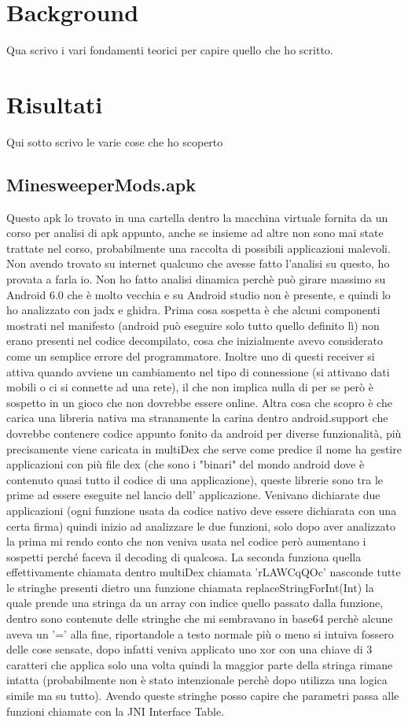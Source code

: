 \documentclass[a4paper,11pt]{article}
\theoremstyle{plain}
\theoremstyle{definition}
\theoremstyle{remark}
\begin{document}
\section{Background}
Qua scrivo i vari fondamenti teorici per capire quello che ho scritto.
\section{Risultati}
Qui sotto scrivo le varie cose che ho scoperto
\subsection{MinesweeperMods.apk}
Questo apk lo trovato in una cartella dentro la macchina virtuale fornita da un corso per analisi di apk appunto, anche se insieme ad altre non sono mai state trattate nel corso, probabilmente una raccolta di possibili applicazioni malevoli. Non avendo trovato su internet qualcuno che avesse fatto l'analisi su questo, ho provata a farla io. Non ho fatto analisi dinamica perchè può girare massimo su Android 6.0 che è molto vecchia e su Android studio non è presente, e quindi lo ho analizzato con jadx e ghidra. Prima cosa sospetta è che alcuni componenti mostrati nel manifesto (android può eseguire solo tutto quello definito lì) non erano presenti nel codice decompilato, cosa che inizialmente avevo considerato come un semplice errore del programmatore. Inoltre uno di questi receiver si attiva quando avviene un cambiamento nel tipo di connessione (si attivano dati mobili o ci si connette ad una rete), il che non implica nulla di per se però è sospetto in un gioco che non dovrebbe essere online. Altra cosa che scopro è che carica una libreria nativa ma stranamente la carina dentro android.support che dovrebbe contenere codice appunto fonito da android per diverse funzionalità, più precisamente viene caricata in multiDex che serve come predice il nome ha gestire applicazioni con più file dex (che sono i "binari" del mondo android dove è contenuto quasi tutto il codice di una applicazione), queste librerie sono tra le prime ad essere eseguite nel lancio dell' applicazione. Venivano dichiarate due applicazioni (ogni funzione usata da codice nativo deve essere dichiarata con una certa firma) quindi inizio ad analizzare le due funzioni, solo dopo aver analizzato la prima mi rendo conto che non veniva usata nel codice però aumentano i sospetti perché faceva il decoding di qualcosa. La seconda funziona quella effettivamente chiamata dentro multiDex chiamata 'rLAWCqQOc' nasconde tutte le stringhe presenti dietro una funzione chiamata replaceStringForInt(Int) la quale prende una stringa da un array con indice quello passato dalla funzione, dentro sono contenute delle stringhe che mi sembravano in base64 perchè alcune aveva un '=' alla fine, riportandole a testo normale più o meno si intuiva fossero delle cose sensate, dopo infatti veniva applicato uno xor con una chiave di 3 caratteri che applica solo una volta quindi la maggior parte della stringa rimane intatta (probabilmente non è stato intenzionale perchè dopo utilizza una logica simile ma su tutto). Avendo queste stringhe posso capire che parametri passa alle funzioni chiamate con la JNI Interface Table.
\end{document}
